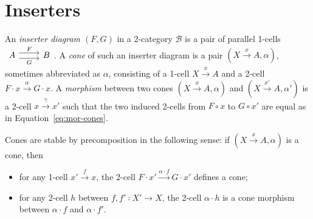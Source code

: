 \section{Inserters}

\begin{definition}
  An \emph{inserter diagram $(F,G)$} in a 2-category $ℬ$ is a pair of parallel 1-cells
  $
  \begin{tikzcd}
  A \doublerightarrow{r}{F}{G} & B
  \end{tikzcd}
  $.
  A \emph{cone} of such an inserter diagram is a pair $(X\xrightarrow{x} A,α)$, sometimes abbreviated as $\alpha$, consisting of a
  1-cell $X\xrightarrow{x} A$ and a 2-cell $ F · x \xrightarrow{α} G · x$.
  A \emph{morphism} between two cones $(X\xrightarrow{x}A,α)$ and $(X\xrightarrow{x'}A,α')$ is
  a 2-cell $x \xrightarrow{γ} x'$ such that the two induced 2-cells from $F∘x$ to
  $G∘x'$ are equal as in Equation~\eqref{eq:mor-cones}.
  \begin{equation}
    \label{eq:mor-cones}

  \end{equation}
\end{definition}
\begin{remark}
  \label{rem:cons-cone}
  Cones are stable by precomposition in the following sense:
  if $(X\xrightarrow{x} A,α)$ is a cone, then
  \begin{itemize}
  \item for any 1-cell $x' \xrightarrow{f} x$, 
  the 2-cell $F ⋅ x' \xrightarrow{\alpha ⋅ f} G ⋅ x'$ defines a cone;
  \item for any 2-cell $h$ between $f,f'∶ X' → X$, 
  the 2-cell $\alpha ⋅ h$ is a cone morphism 
  between $\alpha ⋅ f$ and $\alpha ⋅ f'$. 
  \end{itemize}
\end{remark}
% 

